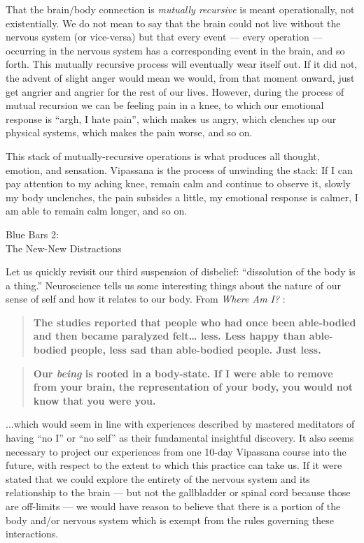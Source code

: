 \documentclass{article}
\begin{document}
That the brain/body connection is \textit{mutually recursive} is meant operationally, not existentially. We do not mean to say that the brain could not live without the nervous system (or vice-versa) but that every event --- every operation --- occurring in the nervous system has a corresponding event in the brain, and so forth. This mutually recursive process will eventually wear itself out. If it did not, the advent of slight anger would mean we would, from that moment onward, just get angrier and angrier for the rest of our lives. However, during the process of mutual recursion we can be feeling pain in a knee, to which our emotional response is ``argh, I hate pain'', which makes us angry, which clenches up our physical systems, which makes the pain worse, and so on.

This stack of mutually-recursive operations is what produces all thought, emotion, and sensation. Vipassana is the process of unwinding the stack: If I can pay attention to my aching knee, remain calm and continue to observe it, slowly my body unclenches, the pain subsides a little, my emotional response is calmer, I am able to remain calm longer, and so on.


\pagebreak

\begin{center}
  \Huge{Blue Bars 2:}\\
  \Huge{The New-New Distractions}
\end{center}

Let us quickly revisit our third suspension of disbelief: ``dissolution of the body is a thing.'' Neuroscience tells us some interesting things about the nature of our sense of self and how it relates to our body. From \textit{Where Am I?} \cite{whereami}:

\begin{quote}
  \textbf{The studies reported that people who had once been able-bodied and then became paralyzed felt… less. Less happy than able-bodied people, less sad than able-bodied people. Just less.}
\end{quote}

\begin{quote}
  \textbf{Our \textit{being} is rooted in a body-state. If I were able to remove from your brain, the representation of your body, you would not know that you were you.}
\end{quote}

...which would seem in line with experiences described by mastered meditators of having ``no I'' or ``no self'' as their fundamental insightful discovery. It also seems necessary to project our experiences from one 10-day Vipassana course into the future, with respect to the extent to which this practice can take us. If it were stated that we could explore the entirety of the nervous system and its relationship to the brain --- but not the gallbladder or spinal cord because those are off-limits --- we would have reason to believe that there is a portion of the body and/or nervous system which is exempt from the rules governing these interactions.
\end{document}
